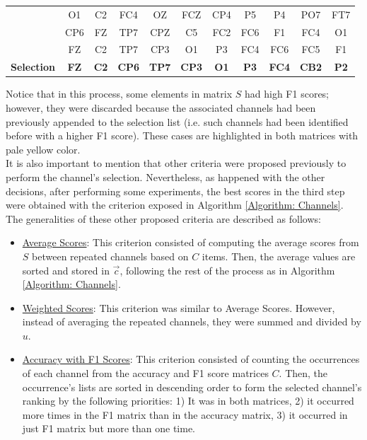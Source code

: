 \begin{table}[h!]
{\begin{tabular}{|*{11}{c|}}
			& \cellcolor[rgb]{ 1,  .902,  .6} O1 & \cellcolor[rgb]{ 1,  .902,  .6} C2 & FC4   & OZ    & FCZ   & CP4   & P5    & P4    & PO7   & FT7 \\\cline{2-11}
			& \cellcolor[rgb]{ 1,  .902,  .6} CP6 & \cellcolor[rgb]{ 1,  .902,  .6} FZ & \cellcolor[rgb]{ 1,  .902,  .6} TP7 & CPZ   & C5    & FC2   & FC6   & F1    & FC4   & O1 \\\cline{2-11}
			& \cellcolor[rgb]{ 1,  .753,  0} FZ & \cellcolor[rgb]{ 1,  .753,  0} C2 & \cellcolor[rgb]{ 1,  .753,  0} TP7 & \cellcolor[rgb]{ 1,  .753,  0} CP3 & \cellcolor[rgb]{ 1,  .753,  0} O1 & \cellcolor[rgb]{ 1,  .753,  0} P3 & FC4   & FC6   & FC5   & F1 \\\hline
			\textbf{Selection} & \cellcolor{orange}\textbf{FZ}    & \cellcolor{orange}\textbf{C2}    & \cellcolor{orange}\textbf{CP6}   & \cellcolor{orange}\textbf{TP7}   & \cellcolor{orange}\textbf{CP3}   & \cellcolor{orange}\textbf{O1}    & \cellcolor{orange}\textbf{P3}    & \cellcolor{orange}\textbf{FC4}   & \cellcolor{orange}\textbf{CB2}   & \cellcolor{orange}\textbf{P2} \\\hline
		\end{tabular}%
	}
	\label{Table: Channel_Selection_Example}%
\end{table}%

Notice that in this process, some elements in matrix $S$ had high F1 scores; however, they were discarded because the associated channels had been previously appended to the selection list (i.e. such channels had been identified before with a higher F1 score). These cases are highlighted in both matrices with pale yellow color.\\

It is also important to mention that other criteria were proposed previously to perform the channel's selection. Nevertheless, as happened with the other decisions, after performing some experiments, the best scores in the third step were obtained with the criterion exposed in Algorithm \ref{Algorithm: Channels}. The generalities of these other proposed criteria are described as follows:
\begin{itemize}
	\item \underline{Average Scores}: This criterion consisted of computing the average scores from $S$ between repeated channels based on $C$ items. Then, the average values are sorted and stored in $\vec{c}$, following the rest of the process as in Algorithm \ref{Algorithm: Channels}.
	\item \underline{Weighted Scores}: This criterion was similar to Average Scores. However, instead of averaging the repeated channels, they were summed and divided by $u$.
	\item \underline{Accuracy with F1 Scores}: This criterion consisted of counting the occurrences of each channel from the accuracy and F1 score matrices $C$. Then, the occurrence's lists are sorted in descending order to form the selected channel's ranking by the following priorities: 1) It was in both matrices, 2) it occurred more times in the F1 matrix than in the accuracy matrix, 3) it occurred in just F1 matrix but more than one time.
\end{itemize}

